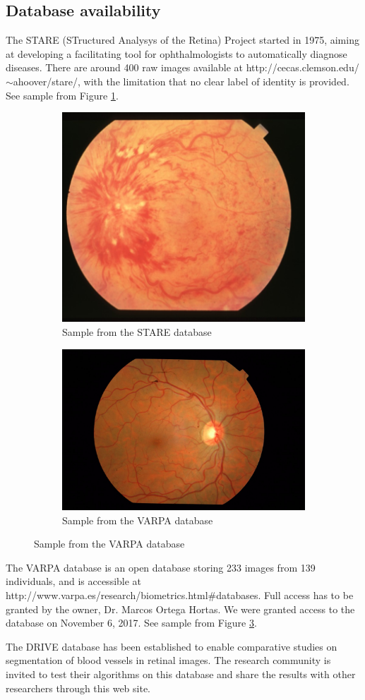 \documentclass[a4paper,11pt]{article}
\theoremstyle{plain} %
\begin{document}
\subsection{Database availability}

The STARE (STructured Analysys of the Retina) Project started in 1975, aiming at developing a facilitating tool for ophthalmologists to automatically diagnose diseases. There are around 400 raw images available at http://cecas.clemson.edu/$\sim$ahoover/stare/, with the limitation that no clear label of identity is provided. See sample from Figure \ref{fig1}.
\begin{figure}
	\begin{subfigure}{0.4\textheight}
		\includegraphics[width=0.4\linewidth]{im0019}
		\caption{Sample from the STARE database}
		\label{fig1}
	\end{subfigure}
    \begin{subfigure}{0.4\textheight}
		\includegraphics[width=0.4\linewidth]{IM000003_17}
		\caption{Sample from the VARPA database}
		\label{fig2}
	\end{subfigure}

\end{figure}

The VARPA database is an open database storing 233 images from 139 individuals, and is accessible at http://www.varpa.es/research/biometrics.html\#databases. Full access has to be granted by the owner, Dr. Marcos Ortega Hortas. We were granted access to the database on November 6, 2017. See sample from Figure \ref{fig2}.

The DRIVE database has been established to enable comparative studies on segmentation of blood vessels in retinal images. The research community is invited to test their algorithms on this database and share the results with other researchers through this web site.
\end{document}
